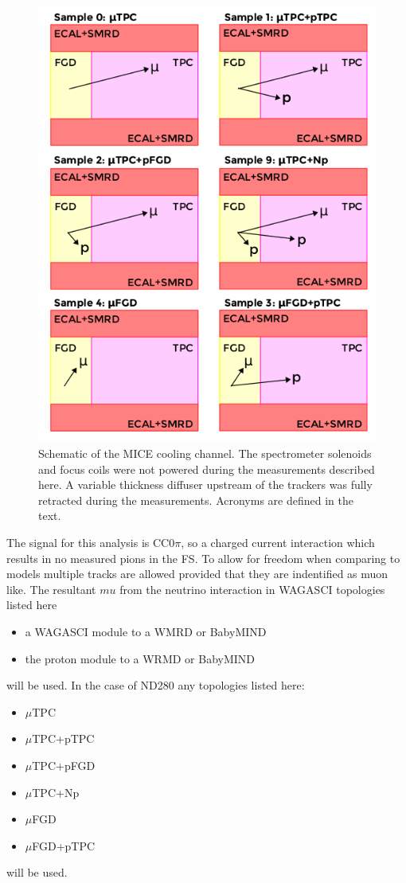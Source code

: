 \documentclass[%
 reprint,
 amsmath,amssymb,
 aps,
]{revtex4-2}
\begin{document}
\begin{figure}[htbp]
\begin{center}
\includegraphics[width=\textwidth]{images/ND280_sig.png}
\end{center}
\caption{Schematic of the MICE cooling channel. The spectrometer solenoids and focus coils were not powered during the measurements described here. A variable thickness diffuser upstream of the trackers was fully retracted during the measurements. Acronyms are defined in the text.}
\label{fig:micecc}
\end{figure}

The signal for this analysis is CC0$\pi$, so a charged current interaction which results in no measured pions in the FS. To allow for freedom when comparing to models multiple tracks are allowed provided that they are indentified as muon like. The resultant $mu$ from the neutrino interaction in WAGASCI topologies listed here 
\begin{itemize}
    \item a WAGASCI module to a WMRD or BabyMIND
    \item the proton module to a WRMD or BabyMIND
\end{itemize} 
will be used. In the case of ND280 any topologies listed here:
\begin{itemize}
    \item $\mu$TPC 
    \item $\mu$TPC+pTPC
    \item $\mu$TPC+pFGD
    \item $\mu$TPC+Np
    \item $\mu$FGD 
    \item $\mu$FGD+pTPC 
\end{itemize} 
will be used. 
\end{document}
